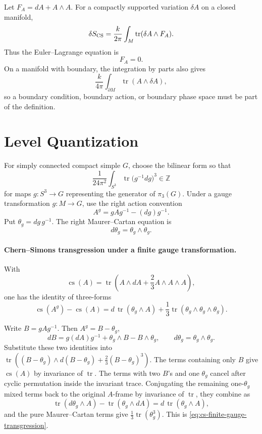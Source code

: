 Let \(F_A=dA+A\wedge A\).  For a compactly supported variation \(\delta A\)
on a closed manifold,
\[
  \delta S_{\rm CS}
  =
  \frac{k}{2\pi}\int_M \operatorname{tr}(\delta A\wedge F_A).
\]
Thus the Euler--Lagrange equation is
\[
  F_A=0 .
\]
On a manifold with boundary, the integration by parts also gives
\[
  \frac{k}{4\pi}\int_{\partial M}\operatorname{tr}(A\wedge\delta A),
\]
so a boundary condition, boundary action, or boundary phase space must be part
of the definition.

\section{Level Quantization}

For simply connected compact simple \(G\), choose the bilinear form so that
\[
  \frac{1}{24\pi^2}\int_{S^3}
  \operatorname{tr}\bigl(g^{-1}dg\bigr)^3\in\mathbb Z
\]
for maps \(g:S^3\to G\) representing the generator of \(\pi_3(G)\).  Under a
gauge transformation \(g:M\to G\), use the right action convention
\[
  A^g=gAg^{-1}-(dg)g^{-1}.
\]
Put \(\theta_g=dg\,g^{-1}\).  The right Maurer--Cartan equation is
\[
  d\theta_g=\theta_g\wedge\theta_g .
\]

\paragraph{Chern--Simons transgression under a finite gauge transformation.}
With
\[
  \operatorname{cs}(A)
  =
  \operatorname{tr}\!\left(A\wedge dA+\frac23A\wedge A\wedge A\right),
\]
one has the identity of three-forms
\begin{equation}
  \operatorname{cs}(A^g)-\operatorname{cs}(A)
  =
  d\,\operatorname{tr}(\theta_g\wedge A)
  +\frac13\operatorname{tr}(\theta_g\wedge\theta_g\wedge\theta_g).
  \label{eq:cs-finite-gauge-transgression}
\end{equation}

Write \(B=gAg^{-1}\).  Then \(A^g=B-\theta_g\),
\[
  dB=g(dA)g^{-1}+\theta_g\wedge B-B\wedge\theta_g,
  \qquad
  d\theta_g=\theta_g\wedge\theta_g .
\]
Substitute these two identities into
\(\operatorname{tr}((B-\theta_g)\wedge d(B-\theta_g)
+\frac23(B-\theta_g)^3)\).  The terms containing only \(B\) give
\(\operatorname{cs}(A)\) by invariance of \(\operatorname{tr}\).  The terms
with two \(B\)'s and one \(\theta_g\) cancel after cyclic permutation inside
the invariant trace.  Conjugating the remaining one-\(\theta_g\) mixed terms
back to the original \(A\)-frame by invariance of \(\operatorname{tr}\), they
combine as
\[
  \operatorname{tr}(d\theta_g\wedge A)
  -\operatorname{tr}(\theta_g\wedge dA)
  =
  d\,\operatorname{tr}(\theta_g\wedge A),
\]
and the pure Maurer--Cartan terms give
\(\frac13\operatorname{tr}(\theta_g^3)\).  This is
\eqref{eq:cs-finite-gauge-transgression}.


